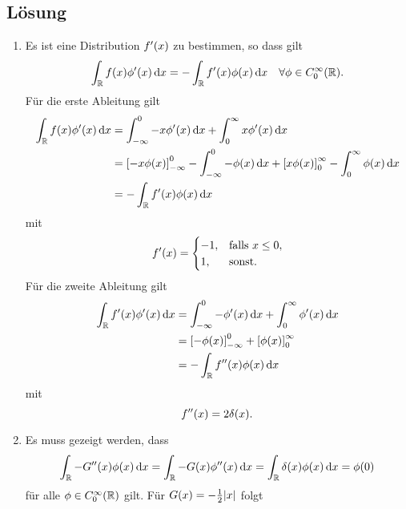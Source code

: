 \documentclass{exercise}
\begin{document}
    \subsection*{Lösung}
    \begin{enumerate}
        \item Es ist eine Distribution \(f'\parentheses*{x}\) zu bestimmen, so dass gilt
        \[
            \int_\R f\parentheses*{x}\phi'\parentheses*{x}\d x = -\int_\R f'\parentheses*{x}\phi\parentheses*{x}\d x \quad \forall\phi \in C_0^\infty\parentheses*{\R}.
        \]
        Für die erste Ableitung gilt
        \begin{align*}
            \int_\R f\parentheses*{x}\phi'\parentheses*{x}\d x &= \int_{-\infty}^0 -x\phi'\parentheses*{x}\d x + \int_0^\infty x\phi'\parentheses*{x}\d x\\
            &= \brackets*{-x\phi\parentheses*{x}}_{-\infty}^0 - \int_{-\infty}^0 -\phi\parentheses*{x}\d x + \brackets*{x\phi\parentheses*{x}}_0^\infty - \int_0^\infty \phi\parentheses*{x}\d x\\
            &= -\int_\R f'\parentheses*{x}\phi\parentheses*{x}\d x
        \end{align*}
        mit
        \[
            f'\parentheses*{x} = \begin{cases}
                -1, & \text{falls }x \le 0,\\
                1, & \text{sonst}.
            \end{cases}
        \]
        Für die zweite Ableitung gilt
        \begin{align*}
            \int_\R f'\parentheses*{x}\phi'\parentheses*{x}\d x &= \int_{-\infty}^0 -\phi'\parentheses*{x}\d x + \int_0^\infty \phi'\parentheses*{x}\d x\\
            &= \brackets*{-\phi\parentheses*{x}}_{-\infty}^0 + \brackets*{\phi\parentheses*{x}}_0^\infty\\
            &= -\int_\R f''\parentheses*{x}\phi\parentheses*{x}\d x
        \end{align*}
        mit
        \[
            f''\parentheses*{x} = 2\delta\parentheses*{x}.
        \]
        \item Es muss gezeigt werden, dass
        \[
            \int_\R -G''\parentheses*{x}\phi\parentheses*{x}\d x = \int_\R -G\parentheses*{x}\phi''\parentheses*{x}\d x = \int_\R \delta\parentheses*{x}\phi\parentheses*{x}\d x = \phi\parentheses*{0}
        \]
        für alle \(\phi \in C_0^\infty\parentheses*{\R}\) gilt.
        Für \(G\parentheses*{x} = -\frac{1}{2}\absolute*{x}\) folgt

\end{enumerate}
\end{document}
